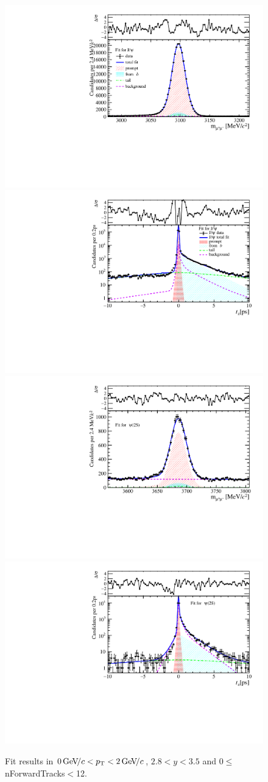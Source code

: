 \begin{figure}[H]
\begin{center}
\includegraphics[width=0.47\linewidth]{pdf/Jpsi/drawmassF/n1y2pt1.pdf}
\includegraphics[width=0.47\linewidth]{pdf/Jpsi/2DFitF/n1y2pt1.pdf}
\vspace*{-0.5cm}
\includegraphics[width=0.47\linewidth]{pdf/Psi2S/drawmassF/n1y2pt1.pdf}
\includegraphics[width=0.47\linewidth]{pdf/Psi2S/2DFitF/n1y2pt1.pdf}
\vspace*{-0.5cm}
\end{center}
\caption{Fit results in $0\text{\,Ge\kern -0.1em V\!/}c<p_{\mathrm{T}}<2\text{\,Ge\kern -0.1em V\!/}c$, $2.8<y<3.5$ and 0$\leq$nForwardTracks$<$12.}
\label{Fitn1y2pt1}
\end{figure}
